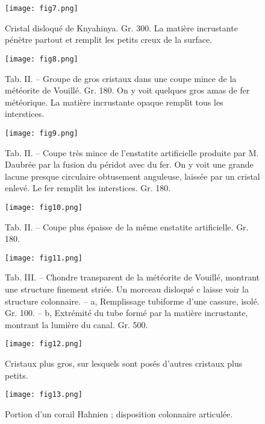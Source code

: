 \documentclass[a4paper, 12pt, oneside, french]{book}
\begin{document}
\begin{figure}[b]
\texttt{[image: fig7.png]}
\caption{Cristal disloqué de Knyahinya. Gr. 300. La matière incrustante pénètre partout et remplit les petits creux de la surface.}
\centering
\end{figure}
\begin{figure}[b]
\texttt{[image: fig8.png]}
\caption{Tab. II. – Groupe de gros cristaux dans une coupe mince de la météorite de Vouillé. Gr. 180. On y voit quelques gros amas de fer météorique. La matière incrustante opaque remplit tous les interstices.}
\centering
\end{figure}
\begin{figure}[b]
\texttt{[image: fig9.png]}
\caption{Tab. II. – Coupe très mince de l'enstatite artificielle produite par M. Daubrée par la fusion du péridot avec du fer. On y voit une grande lacune presque circulaire obtusement anguleuse, laissée par un cristal enlevé. Le fer remplit les interstices. Gr. 180.}
\centering
\end{figure}
\begin{figure}[b]
\texttt{[image: fig10.png]}
\caption{Tab. II. – Coupe plus épaisse de la même enstatite artificielle. Gr. 180.}
\centering
\end{figure}
\begin{figure}[b]
\texttt{[image: fig11.png]}
\caption{Tab. III. – Chondre transparent de la météorite de Vouillé, montrant une structure finement striée. Un morceau disloqué c laisse voir la structure colonnaire. – a, Remplissage tubiforme d'une cassure, isolé. Gr. 100. – b, Extrémité du tube formé par la matière incrustante, montrant la lumière du canal. Gr. 500.}
\centering
\end{figure}
\clearpage
{}
\begin{figure}[b]
\texttt{[image: fig12.png]}
\caption{Cristaux plus gros, sur lesquels sont posés d'autres cristaux plus petits.}
\centering
\end{figure}
\begin{figure}[b]
\texttt{[image: fig13.png]}
\caption{Portion d'un corail Hahnien ; disposition colonnaire articulée.}
\centering
\end{figure}
\end{document}
